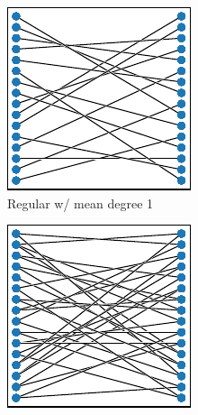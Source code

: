 \begin{figure}[!htbp]
\begin{center}
\begin{minipage}{0.95\textwidth}
\begin{minipage}{\textwidth}
\begin{minipage}{0.05\linewidth}
\large
{}
\end{minipage}%
\begin{minipage}{0.95\linewidth}
\begin{subfigure}[b]{0.5\textwidth}
\centering
\includegraphics[width=\textwidth]{img/graph_layouts/title=regular-1+ext=}%
\caption{
Regular w/ mean degree 1
}
\label{fig:regular_degree_1}
\label{fig:regular_1}
\end{subfigure}
\begin{subfigure}[b]{0.5\textwidth}
\centering
\includegraphics[width=\textwidth]{img/graph_layouts/title=regular-2+ext=}%

\end{subfigure}
\end{minipage}
\end{minipage}
\end{minipage}
\end{center}
\end{figure}

